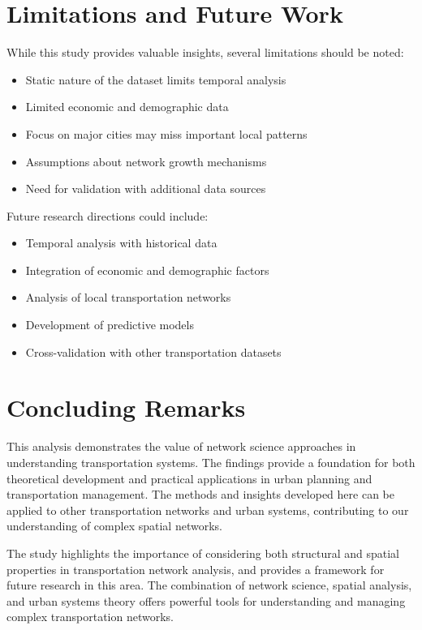 \section{Limitations and Future Work}
While this study provides valuable insights, several limitations should be noted:

\begin{itemize}
    \item Static nature of the dataset limits temporal analysis
    \item Limited economic and demographic data
    \item Focus on major cities may miss important local patterns
    \item Assumptions about network growth mechanisms
    \item Need for validation with additional data sources
\end{itemize}

Future research directions could include:
\begin{itemize}
    \item Temporal analysis with historical data
    \item Integration of economic and demographic factors
    \item Analysis of local transportation networks
    \item Development of predictive models
    \item Cross-validation with other transportation datasets
\end{itemize}

\section{Concluding Remarks}
This analysis demonstrates the value of network science approaches in understanding transportation systems. The findings provide a foundation for both theoretical development and practical applications in urban planning and transportation management. The methods and insights developed here can be applied to other transportation networks and urban systems, contributing to our understanding of complex spatial networks.

The study highlights the importance of considering both structural and spatial properties in transportation network analysis, and provides a framework for future research in this area. The combination of network science, spatial analysis, and urban systems theory offers powerful tools for understanding and managing complex transportation networks. 